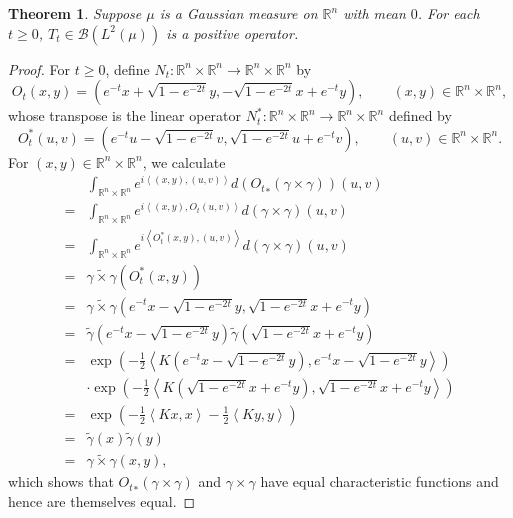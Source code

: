 \documentclass{article}
\newcommand{\inner}[2]{\left\langle #1, #2 \right\rangle}
\newtheorem{theorem}{Theorem}
\theoremstyle{definition}
\begin{document}
\begin{theorem}
Suppose $\mu$ is a Gaussian measure on $\mathbb{R}^n$ with mean $0$. 
For each $t \geq 0$, $T_t \in \mathscr{B}(L^2(\mu))$
is a positive operator.
\end{theorem}
\begin{proof}
For $t \geq 0$, define $N_t:\mathbb{R}^n \times \mathbb{R}^n \to \mathbb{R}^n \times  \mathbb{R}^n$ by
\[
O_t(x,y) = \left(e^{-t}x+\sqrt{1-e^{-2t}}y,-\sqrt{1-e^{-2t}}x+e^{-t}y\right), \qquad (x,y) \in \mathbb{R}^n \times \mathbb{R}^n,
\]
whose transpose is the linear operator $N_t^*:\mathbb{R}^n \times \mathbb{R}^n \to \mathbb{R}^n \times  \mathbb{R}^n$ defined by
\[
O_t^*(u,v) = \left(e^{-t}u-\sqrt{1-e^{-2t}}v,\sqrt{1-e^{-2t}}u+e^{-t}v\right), \qquad (u,v) \in \mathbb{R}^n \times \mathbb{R}^n.
\]
For $(x,y) \in \mathbb{R}^n \times \mathbb{R}^n$, we calculate 
\[
\begin{split}
&\int_{\mathbb{R}^n \times \mathbb{R}^n} e^{i\inner{(x,y)}{(u,v)}} d({O_t}_*(\gamma \times \gamma))(u,v)\\
=&\int_{\mathbb{R}^n \times \mathbb{R}^n} e^{i\inner{(x,y)}{O_t(u,v)}} d(\gamma \times \gamma)(u,v)\\
=&\int_{\mathbb{R}^n \times \mathbb{R}^n}  e^{i\inner{O_t^*(x,y)}{(u,v)}} d(\gamma \times \gamma)(u,v)\\
=&\widetilde{\gamma \times \gamma}(O_t^*(x,y))\\
=&\widetilde{\gamma \times \gamma}(e^{-t}x-\sqrt{1-e^{-2t}}y,\sqrt{1-e^{-2t}}x+e^{-t}y)\\
=&\widetilde{\gamma}(e^{-t}x-\sqrt{1-e^{-2t}}y) \widetilde{\gamma}(\sqrt{1-e^{-2t}}x+e^{-t}y)\\
=&\exp\left(-\frac{1}{2}\inner{K(e^{-t}x-\sqrt{1-e^{-2t}}y)}{e^{-t}x-\sqrt{1-e^{-2t}}y}\right)\\
&\cdot \exp\left(-\frac{1}{2}\inner{K(\sqrt{1-e^{-2t}}x+e^{-t}y)}{\sqrt{1-e^{-2t}}x+e^{-t}y} \right)\\
=&\exp\left(-\frac{1}{2}\inner{Kx}{x}-\frac{1}{2}\inner{Ky}{y}\right)\\
=&\widetilde{\gamma}(x) \widetilde{\gamma}(y)\\
=&\widetilde{\gamma \times \gamma}(x,y),
\end{split}
\]
which shows that ${O_t}_*(\gamma \times \gamma)$ and $\gamma \times \gamma$ have equal characteristic functions and hence
are themselves equal. 


\end{proof}
\end{document}
